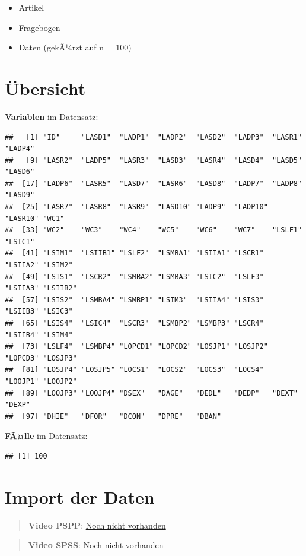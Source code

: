 \documentclass[
]{book}
\providecommand{\tightlist}{%
  \setlength{\itemsep}{0pt}\setlength{\parskip}{0pt}}
\begin{document}
\begin{itemize}
\tightlist
\item
  Artikel
\item
  Fragebogen
\item
  Daten (gekÃ¼rzt auf n = 100)
\end{itemize}

\hypertarget{uxfcbersicht}{%
\section{Übersicht}\label{uxfcbersicht}}

\textbf{Variablen} im Datensatz:

\begin{verbatim}
##   [1] "ID"     "LASD1"  "LADP1"  "LADP2"  "LASD2"  "LADP3"  "LASR1"  "LADP4" 
##   [9] "LASR2"  "LADP5"  "LASR3"  "LASD3"  "LASR4"  "LASD4"  "LASD5"  "LASD6" 
##  [17] "LADP6"  "LASR5"  "LASD7"  "LASR6"  "LASD8"  "LADP7"  "LADP8"  "LASD9" 
##  [25] "LASR7"  "LASR8"  "LASR9"  "LASD10" "LADP9"  "LADP10" "LASR10" "WC1"   
##  [33] "WC2"    "WC3"    "WC4"    "WC5"    "WC6"    "WC7"    "LSLF1"  "LSIC1" 
##  [41] "LSIM1"  "LSIIB1" "LSLF2"  "LSMBA1" "LSIIA1" "LSCR1"  "LSIIA2" "LSIM2" 
##  [49] "LSIS1"  "LSCR2"  "LSMBA2" "LSMBA3" "LSIC2"  "LSLF3"  "LSIIA3" "LSIIB2"
##  [57] "LSIS2"  "LSMBA4" "LSMBP1" "LSIM3"  "LSIIA4" "LSIS3"  "LSIIB3" "LSIC3" 
##  [65] "LSIS4"  "LSIC4"  "LSCR3"  "LSMBP2" "LSMBP3" "LSCR4"  "LSIIB4" "LSIM4" 
##  [73] "LSLF4"  "LSMBP4" "LOPCD1" "LOPCD2" "LOSJP1" "LOSJP2" "LOPCD3" "LOSJP3"
##  [81] "LOSJP4" "LOSJP5" "LOCS1"  "LOCS2"  "LOCS3"  "LOCS4"  "LOOJP1" "LOOJP2"
##  [89] "LOOJP3" "LOOJP4" "DSEX"   "DAGE"   "DEDL"   "DEDP"   "DEXT"   "DEXP"  
##  [97] "DHIE"   "DFOR"   "DCON"   "DPRE"   "DBAN"
\end{verbatim}

\textbf{FÃ¤lle} im Datensatz:

\begin{verbatim}
## [1] 100
\end{verbatim}

\hypertarget{import-der-daten}{%
\section{Import der Daten}\label{import-der-daten}}

\begin{quote}
\textbf{Video PSPP}: \href{TBA}{Noch nicht vorhanden}
\end{quote}

\begin{quote}
\textbf{Video SPSS}: \href{TBA}{Noch nicht vorhanden}
\end{quote}
\end{document}
